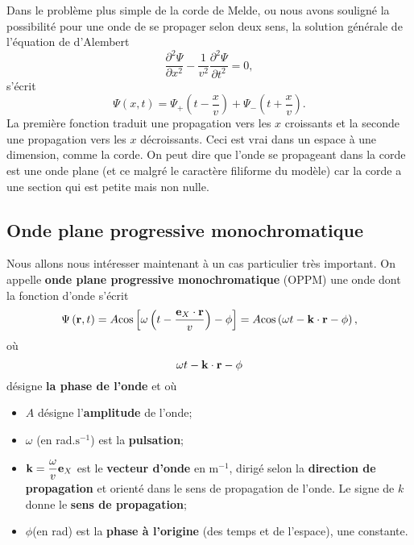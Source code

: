 \documentclass[11pt,a4paper]{report}
\begin{document}
Dans le problème plus simple de la corde de Melde, ou nous avons souligné la possibilité pour une onde de se propager selon deux sens, la solution générale de l'équation de d'Alembert
\begin{equation}
	\frac{\partial^2 \Psi}{\partial x^2} - \frac{1}{v^2}\frac{\partial^2 \Psi}{\partial t^2} = 0,
\end{equation}
s'écrit 
\begin{equation}
	\Psi(x,t) = \Psi_+\left(t - \frac{x}{v}\right) + \Psi_-\left(t + \frac{x}{v}\right).
\end{equation}	
La première fonction traduit une propagation vers les $x$ croissants et la seconde une propagation vers les $x$ décroissants. Ceci est vrai dans un espace à une dimension, comme la corde. On peut dire que l'onde se propageant dans la corde est une onde plane (et ce malgré le caractère filiforme du modèle) car la corde a une section qui est petite mais non nulle.

\subsection{Onde plane progressive monochromatique}

Nous allons nous intéresser maintenant à un cas particulier très important. On appelle \textbf{onde plane progressive monochromatique} (OPPM) une onde dont la fonction d'onde s'écrit
\begin{equation}
	\Psi\left(\bold{r},t\right) = A \text{cos}\left[\omega\left(t - \frac{\bold{e}_X\cdot\bold{r}}{v}\right) - \phi \right] = A \text{cos}\left(\omega t - \bold{k}\cdot\bold{r} - \phi\right),
\end{equation}
où
\begin{equation}
	\omega t - \bold{k}\cdot\bold{r} - \phi
\end{equation}
désigne \textbf{la phase de l'onde} et où
\begin{itemize}
	\item $A$ désigne l'\textbf{amplitude} de l'onde;
	\item $\omega$ (en rad.$\text{s}^{-1}$) est la \textbf{pulsation};
	\item $\bold{k} = \displaystyle{\frac{\omega}{v}}\bold{e}_X$ est le \textbf{vecteur d'onde} en $\text{m}^{-1}$, dirigé selon la \textbf{direction de propagation} et orienté dans le sens de propagation de l'onde. Le signe de $k$ donne le \textbf{sens de propagation};
	\item $\phi$(en rad) est la \textbf{phase à l'origine} (des temps et de l'espace), une constante.
\end{itemize}
\end{document}
